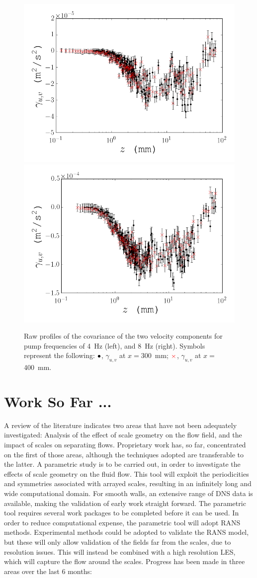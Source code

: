 \documentclass[12pt,oneside,a4paper]{article}
\begin{document}
\begin{figure}[!h]
\centering
\includegraphics[width=0.5\linewidth]{images/LDA_profileImages/cov_4hz.png}\hfill
\includegraphics[width=0.5\linewidth]{images/LDA_profileImages/cov_8hz.png}
\caption{Raw profiles of the covariance of the two velocity components for pump frequencies of \SI{4}{Hz} (left), and \SI{8}{Hz} (right). Symbols represent the following: $\color{black}{\bullet}$, $\gamma_{u,v}$ at $x=$\SI{300}{mm}; $\color{red}{\times}$, $\gamma_{u,v}$ at $x=$\SI{400}{mm}.}
\label{figure:experiments:profiles:gamma}
\end{figure}


\newpage
\section{Work So Far ...}
A review of the literature indicates two areas that have not been adequately investigated: Analysis of the effect of scale geometry on the flow field, and the impact of scales on separating flows. Proprietary work has, so far, concentrated on the first of those areas, although the techniques adopted are transferable to the latter. A parametric study is to be carried out, in order to investigate the effects of scale geometry on the fluid flow. This tool will exploit the periodicities and symmetries associated with arrayed scales, resulting in an infinitely long and wide computational domain. For smooth walls, an extensive range of DNS data is available, making the validation of early work straight forward. The parametric tool requires several work packages to be completed before it can be used. In order to reduce computational expense, the parametric tool will adopt RANS methods. Experimental methods could be adopted to validate the RANS model, but these will only allow validation of the fields far from the scales, due to resolution issues. This will instead be combined with a high resolution LES, which will capture the flow around the scales. Progress has been made in three areas over the last 6 months:
\end{document}
